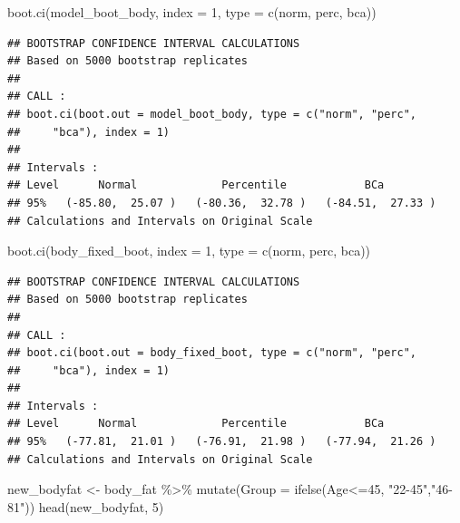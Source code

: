 \documentclass[
]{article}
\newenvironment{Shaded}{\begin{snugshade}}{\end{snugshade}}
\newcommand{\AttributeTok}[1]{\textcolor[rgb]{0.77,0.63,0.00}{#1}}
\newcommand{\DecValTok}[1]{\textcolor[rgb]{0.00,0.00,0.81}{#1}}
\newcommand{\FunctionTok}[1]{\textcolor[rgb]{0.00,0.00,0.00}{#1}}
\newcommand{\NormalTok}[1]{#1}
\newcommand{\OtherTok}[1]{\textcolor[rgb]{0.56,0.35,0.01}{#1}}
\newcommand{\SpecialCharTok}[1]{\textcolor[rgb]{0.00,0.00,0.00}{#1}}
\newcommand{\StringTok}[1]{\textcolor[rgb]{0.31,0.60,0.02}{#1}}
\begin{document}
\begin{Shaded}
\begin{Highlighting}[]
\FunctionTok{boot.ci}\NormalTok{(model\_boot\_body, }\AttributeTok{index =} \DecValTok{1}\NormalTok{, }\AttributeTok{type =} \FunctionTok{c}\NormalTok{(}\StringTok{\textquotesingle{}norm\textquotesingle{}}\NormalTok{, }\StringTok{\textquotesingle{}perc\textquotesingle{}}\NormalTok{, }\StringTok{\textquotesingle{}bca\textquotesingle{}}\NormalTok{))}
\end{Highlighting}
\end{Shaded}

\begin{verbatim}
## BOOTSTRAP CONFIDENCE INTERVAL CALCULATIONS
## Based on 5000 bootstrap replicates
## 
## CALL : 
## boot.ci(boot.out = model_boot_body, type = c("norm", "perc", 
##     "bca"), index = 1)
## 
## Intervals : 
## Level      Normal             Percentile            BCa          
## 95%   (-85.80,  25.07 )   (-80.36,  32.78 )   (-84.51,  27.33 )  
## Calculations and Intervals on Original Scale
\end{verbatim}

\begin{Shaded}
\begin{Highlighting}[]
\FunctionTok{boot.ci}\NormalTok{(body\_fixed\_boot, }\AttributeTok{index =} \DecValTok{1}\NormalTok{, }\AttributeTok{type =} \FunctionTok{c}\NormalTok{(}\StringTok{\textquotesingle{}norm\textquotesingle{}}\NormalTok{, }\StringTok{\textquotesingle{}perc\textquotesingle{}}\NormalTok{, }\StringTok{\textquotesingle{}bca\textquotesingle{}}\NormalTok{))}
\end{Highlighting}
\end{Shaded}

\begin{verbatim}
## BOOTSTRAP CONFIDENCE INTERVAL CALCULATIONS
## Based on 5000 bootstrap replicates
## 
## CALL : 
## boot.ci(boot.out = body_fixed_boot, type = c("norm", "perc", 
##     "bca"), index = 1)
## 
## Intervals : 
## Level      Normal             Percentile            BCa          
## 95%   (-77.81,  21.01 )   (-76.91,  21.98 )   (-77.94,  21.26 )  
## Calculations and Intervals on Original Scale
\end{verbatim}

\begin{Shaded}
\begin{Highlighting}[]
\NormalTok{new\_bodyfat }\OtherTok{\textless{}{-}}\NormalTok{ body\_fat }\SpecialCharTok{\%\textgreater{}\%} \FunctionTok{mutate}\NormalTok{(}\AttributeTok{Group =} \FunctionTok{ifelse}\NormalTok{(Age}\SpecialCharTok{\textless{}=}\DecValTok{45}\NormalTok{, }\StringTok{"22{-}45"}\NormalTok{,}\StringTok{"46{-}81"}\NormalTok{))}
\FunctionTok{head}\NormalTok{(new\_bodyfat, }\DecValTok{5}\NormalTok{)}
\end{Highlighting}
\end{Shaded}
\end{document}
